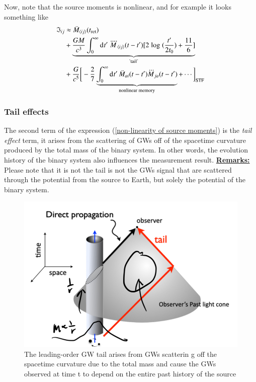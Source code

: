 \documentclass[a4paper, 12pt]{article}
\begin{document}
  Now, note that the source moments is nonlinear, and for example it
  looks something like 
  \begin{align}
    \label{non-linearity of source moments}
    \mathfrak{I}_{ij} &\approx \ddot{M}_{\langle ij \rangle  }
    (t_{\mathrm{ret}}) \\ 
    &+ \underbrace{\frac{GM}{c^3} \int_{0}^{\infty} \dd[]{t^{\prime}}
    \ddddot{M}_{\langle ij \rangle  } (t -
    t^{\prime})[2
    \hspace{0.1cm}\mathrm{log}\hspace{0.1cm}(\frac{t^{\prime}}{2t_0}) +
    \frac{11}{6}]}_{\textrm{'tail'}} \nonumber\\ 
    &+ \frac{G}{c^5}\bigg[-\frac{2}{7}
    \underbrace{\int_{0}^{\infty} \dd[]{t^{\prime}}
    \ddot{M}_{ai}(t - t^{\prime}) \dddot{M}_{ja} (t - t^{\prime})
    }_{\textrm{nonlinear memory}} + \cdots \bigg]_{\mathrm{STF}} \nonumber
  \end{align}

  \subsubsection{Tail effects}%
    \label{sub:Tail effects}
    The second term of the expression (\ref{non-linearity of source
    moments}) is the \textit{tail effect} term, it arises from the
    scattering of  GWs off of the spacetime curvature produced by the
    total mass of the binary system. In other words, the evolution
    history of the binary system also influences the measurement result. 
    \textbf{\underline{Remarks: }} Please note that it is not the tail
    is not the GWs signal that are scattered through the potential
    from the source to Earth, but solely the potential of the binary
    system. 
    \begin{figure}[h!]
    \begin{center}
      \includegraphics[scale=0.3]{Figures/tail.jpeg}
    \end{center}
    \caption{The leading-order GW tail arises from GWs scatterin g off the
      spacetime curvature due to the total mass and cause the GWs
      observed at time t to depend on the entire past history of the
      source}
    \label{fig:tail}
    \end{figure}
\end{document}

